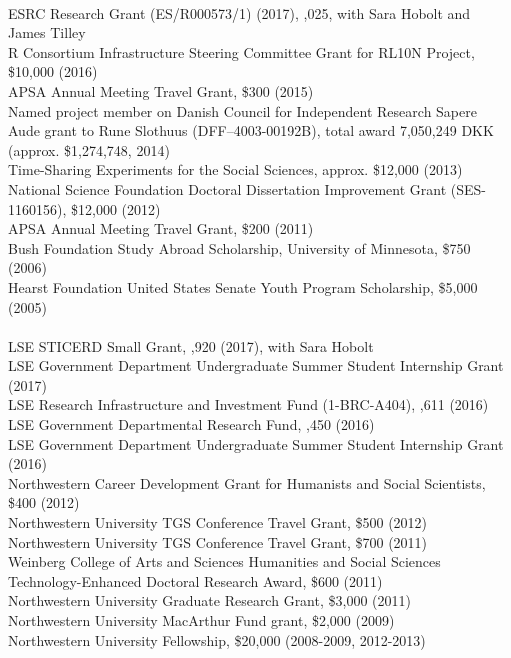 \documentclass[12pt]{article}
\renewcommand{\section}[1]{\pagebreak[3]%
    \llap{\scshape\smash{\parbox[t]{\marginparwidth}{\raggedright {\color{lg}#1}}}}%
    \vspace{-\baselineskip}\par}
\newcommand{\topic}[1]{\pagebreak[3]\indent {\color{lg}{\footnotesize #1 }}\\}
\newcommand{\entry}[1]{\indent {\color{lg}\guillemotright}\hspace{2pt}#1\vspace{.25em}\\}
\begin{document}
{\section{Grants \&\\Funding}
\topic{External Sources}
	\entry{ESRC Research Grant (ES/R000573/1) (2017), ,025, with Sara Hobolt and James Tilley}
    \entry{R Consortium Infrastructure Steering Committee Grant for RL10N Project, \$10,000 (2016)}
	\entry{APSA Annual Meeting Travel Grant, \$300 (2015)}
	\entry{Named project member on Danish Council for Independent Research Sapere Aude grant to Rune Slothuus (DFF--4003-00192B), total award 7,050,249 DKK (approx. \$1,274,748, 2014)}
	\entry{Time-Sharing Experiments for the Social Sciences, approx. \$12,000 (2013)}
	\entry{National Science Foundation Doctoral Dissertation Improvement Grant (SES-1160156), \$12,000 (2012)}
	\entry{APSA Annual Meeting Travel Grant, \$200 (2011)}
	\entry{Bush Foundation Study Abroad Scholarship, University of Minnesota, \$750 (2006)}
	\entry{Hearst Foundation United States Senate Youth Program Scholarship, \$5,000 (2005)}
	
	\topic{Institutional Sources}
	\entry{LSE STICERD Small Grant, ,920 (2017), with Sara Hobolt}
    \entry{LSE Government Department Undergraduate Summer Student Internship Grant (2017)}
    \entry{LSE Research Infrastructure and Investment Fund (1-BRC-A404), \textsterling 11,611 (2016)}
	\entry{LSE Government Departmental Research Fund, ,450 (2016)}
	\entry{LSE Government Department Undergraduate Summer Student Internship Grant (2016)}
	\entry{Northwestern Career Development Grant for Humanists and Social Scientists, \$400 (2012)}
	\entry{Northwestern University TGS Conference Travel Grant, \$500 (2012)}
	\entry{Northwestern University TGS Conference Travel Grant, \$700 (2011)}
	\entry{Weinberg College of Arts and Sciences Humanities and Social Sciences Technology-Enhanced Doctoral Research Award, \$600 (2011)}
	\entry{Northwestern University Graduate Research Grant, \$3,000 (2011)}
	\entry{Northwestern University MacArthur Fund grant, \$2,000 (2009)}
	\entry{Northwestern University Fellowship, \$20,000 (2008-2009, 2012-2013)}

}
\end{document}
